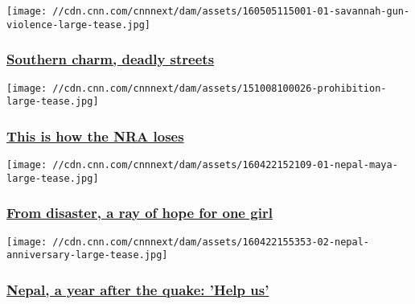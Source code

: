 \href{/2016/05/19/health/savannah-georgia-high-murder-rate/index.html}{}

\texttt{[image: //cdn.cnn.com/cnnnext/dam/assets/160505115001-01-savannah-gun-violence-large-tease.jpg]}

\hypertarget{southern-charm-deadly-streets}{%
\subsubsection{\texorpdfstring{\href{/2016/05/19/health/savannah-georgia-high-murder-rate/index.html}{Southern
charm, deadly
streets}}{Southern charm, deadly streets}}\label{southern-charm-deadly-streets}}

\href{/2015/10/15/politics/defy-gun-lobby/index.html}{}

\texttt{[image: //cdn.cnn.com/cnnnext/dam/assets/151008100026-prohibition-large-tease.jpg]}

\hypertarget{this-is-how-the-nra-loses}{%
\subsubsection{\texorpdfstring{\href{/2015/10/15/politics/defy-gun-lobby/index.html}{This
is how the NRA
loses}}{This is how the NRA loses}}\label{this-is-how-the-nra-loses}}

\href{/2016/04/23/health/nepal-earthquake-anniversary-one-girls-remarkable-recovery/index.html}{}

\texttt{[image: //cdn.cnn.com/cnnnext/dam/assets/160422152109-01-nepal-maya-large-tease.jpg]}

\hypertarget{from-disaster-a-ray-of-hope-for-one-girl}{%
\subsubsection{\texorpdfstring{\href{/2016/04/23/health/nepal-earthquake-anniversary-one-girls-remarkable-recovery/index.html}{From
disaster, a ray of hope for one
girl}}{From disaster, a ray of hope for one girl}}\label{from-disaster-a-ray-of-hope-for-one-girl}}

\href{http://www.cnn.com/interactive/2016/04/world/nepal-one-year-later/}{}

\texttt{[image: //cdn.cnn.com/cnnnext/dam/assets/160422155353-02-nepal-anniversary-large-tease.jpg]}

\hypertarget{nepal-a-year-after-the-quake-help-us}{%
\subsubsection{\texorpdfstring{\href{http://www.cnn.com/interactive/2016/04/world/nepal-one-year-later/}{Nepal,
a year after the quake: 'Help
us'}}{Nepal, a year after the quake: 'Help us'}}\label{nepal-a-year-after-the-quake-help-us}}

